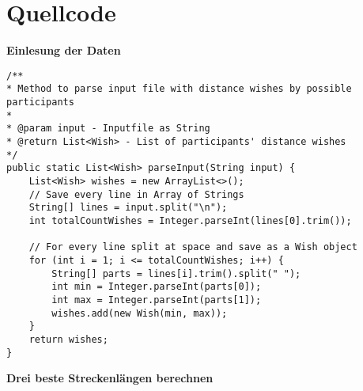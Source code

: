 \documentclass[a4paper,10pt,ngerman]{scrartcl}
\begin{document}
\section{Quellcode}
\textbf{Einlesung der Daten}
\begin{lstlisting}
/**
* Method to parse input file with distance wishes by possible participants
* 
* @param input - Inputfile as String
* @return List<Wish> - List of participants' distance wishes
*/
public static List<Wish> parseInput(String input) {
    List<Wish> wishes = new ArrayList<>();
    // Save every line in Array of Strings
    String[] lines = input.split("\n");
    int totalCountWishes = Integer.parseInt(lines[0].trim());

    // For every line split at space and save as a Wish object
    for (int i = 1; i <= totalCountWishes; i++) {
        String[] parts = lines[i].trim().split(" ");
        int min = Integer.parseInt(parts[0]);
        int max = Integer.parseInt(parts[1]);
        wishes.add(new Wish(min, max));
    }
    return wishes;
}
\end{lstlisting}
\textbf{Drei beste Streckenlängen berechnen}
\end{document}

